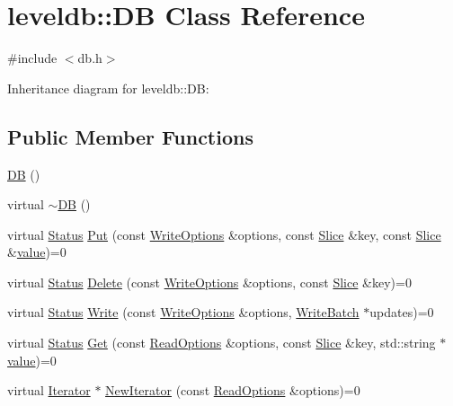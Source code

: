 \hypertarget{classleveldb_1_1_d_b}{\section{leveldb\-:\-:D\-B Class Reference}
\label{classleveldb_1_1_d_b}
}


{\ttfamily \#include $<$db.\-h$>$}



Inheritance diagram for leveldb\-:\-:D\-B\-:
\subsection*{Public Member Functions}
\begin{DoxyCompactItemize}
\item 
\hyperlink{classleveldb_1_1_d_b_a6b275339ff6194c598daf7091ad8d5c1}{D\-B} ()
\item 
virtual \hyperlink{classleveldb_1_1_d_b_a15f516eb9ec41812419a7160b4740a22}{$\sim$\-D\-B} ()
\item 
virtual \hyperlink{classleveldb_1_1_status}{Status} \hyperlink{classleveldb_1_1_d_b_ac2e472812630ed74298df7b03b08c1ae}{Put} (const \hyperlink{structleveldb_1_1_write_options}{Write\-Options} \&options, const \hyperlink{classleveldb_1_1_slice}{Slice} \&key, const \hyperlink{classleveldb_1_1_slice}{Slice} \&\hyperlink{cache_8cc_a0f61d63b009d0880a89c843bd50d8d76}{value})=0
\item 
virtual \hyperlink{classleveldb_1_1_status}{Status} \hyperlink{classleveldb_1_1_d_b_aff7577239799cd059464701c548090b9}{Delete} (const \hyperlink{structleveldb_1_1_write_options}{Write\-Options} \&options, const \hyperlink{classleveldb_1_1_slice}{Slice} \&key)=0
\item 
virtual \hyperlink{classleveldb_1_1_status}{Status} \hyperlink{classleveldb_1_1_d_b_ae0b6ded8c8e0b88ff70190bf7a0c086c}{Write} (const \hyperlink{structleveldb_1_1_write_options}{Write\-Options} \&options, \hyperlink{classleveldb_1_1_write_batch}{Write\-Batch} $\ast$updates)=0
\item 
virtual \hyperlink{classleveldb_1_1_status}{Status} \hyperlink{classleveldb_1_1_d_b_ad43bd7937b9af88ff856eb8158890911}{Get} (const \hyperlink{structleveldb_1_1_read_options}{Read\-Options} \&options, const \hyperlink{classleveldb_1_1_slice}{Slice} \&key, std\-::string $\ast$\hyperlink{cache_8cc_a0f61d63b009d0880a89c843bd50d8d76}{value})=0
\item 
virtual \hyperlink{classleveldb_1_1_iterator}{Iterator} $\ast$ \hyperlink{classleveldb_1_1_d_b_a5629308235de24c05c286c353d4e7d32}{New\-Iterator} (const \hyperlink{structleveldb_1_1_read_options}{Read\-Options} \&options)=0

\end{DoxyCompactItemize}
